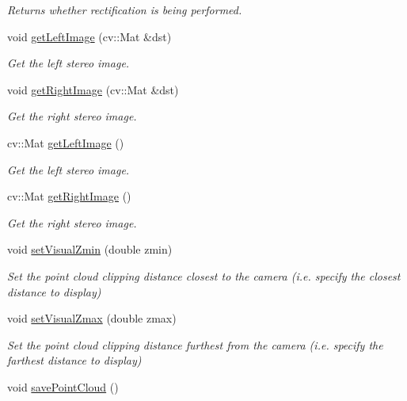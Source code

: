 \begin{DoxyCompactItemize}
\begin{DoxyCompactList}\small\item\em Returns whether rectification is being performed. \end{DoxyCompactList}\item 
void \hyperlink{class_abstract_stereo_camera_aa25785c072f75c58b43578c2e718b3c1}{get\+Left\+Image} (cv\+::\+Mat \&dst)
\begin{DoxyCompactList}\small\item\em Get the left stereo image. \end{DoxyCompactList}\item 
void \hyperlink{class_abstract_stereo_camera_aab92c03296efcc915e00cb31016c0c74}{get\+Right\+Image} (cv\+::\+Mat \&dst)
\begin{DoxyCompactList}\small\item\em Get the right stereo image. \end{DoxyCompactList}\item 
cv\+::\+Mat \hyperlink{class_abstract_stereo_camera_abafa9c808e5b2d32cc8e2c9e89fdbb09}{get\+Left\+Image} ()
\begin{DoxyCompactList}\small\item\em Get the left stereo image. \end{DoxyCompactList}\item 
cv\+::\+Mat \hyperlink{class_abstract_stereo_camera_a8b3611b30d65c90128ea59df9e5b9804}{get\+Right\+Image} ()
\begin{DoxyCompactList}\small\item\em Get the right stereo image. \end{DoxyCompactList}\item 
void \hyperlink{class_abstract_stereo_camera_a176f96b1e0cadc210b4a4b73bd51069e}{set\+Visual\+Zmin} (double zmin)
\begin{DoxyCompactList}\small\item\em Set the point cloud clipping distance closest to the camera (i.\+e. specify the closest distance to display) \end{DoxyCompactList}\item 
void \hyperlink{class_abstract_stereo_camera_a5da7d8b7074a30583f22d0efd0af5f28}{set\+Visual\+Zmax} (double zmax)
\begin{DoxyCompactList}\small\item\em Set the point cloud clipping distance furthest from the camera (i.\+e. specify the farthest distance to display) \end{DoxyCompactList}\item 
\hypertarget{class_abstract_stereo_camera_a895b0205fd95e9cd59598d95da7e4b8a}{}void \hyperlink{class_abstract_stereo_camera_a895b0205fd95e9cd59598d95da7e4b8a}{save\+Point\+Cloud} ()\label{class_abstract_stereo_camera_a895b0205fd95e9cd59598d95da7e4b8a}


\end{DoxyCompactItemize}

